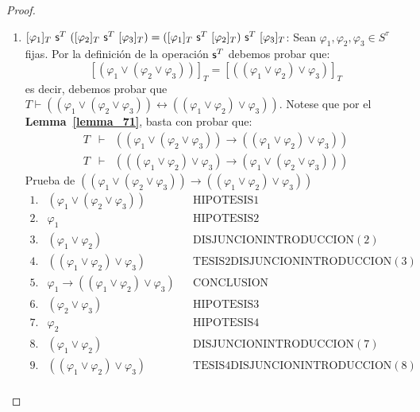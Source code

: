 \begin{proof}
\begin{enumerate}[(1)]
      \item $[\varphi_{1}]_{T} \ \SU^{T} \ ([\varphi_{2}]_{T} \ \SU^{T} \ [\varphi_{3}]_{T}) = ([\varphi_{1}]_{T} \
        \SU^{T} \ [\varphi_{2}]_{T}) \ \SU^{T} \ [\varphi_{3}]_{T}$: Sean $\varphi_{1}, \varphi_{2}, \varphi_{3} \in
        S^{\tau}$ fijas. Por la definición de la operación $\mathsf{s}^{T}$ debemos probar que:
        \[
          [(\varphi_{1} \vee (\varphi_{2} \vee \varphi_{3}))]_{T} = [((\varphi_{1} \vee \varphi_{2}) \vee
          \varphi_{3})]_{T}
        \]
        \PN es decir, debemos probar que $T \vdash ((\varphi_{1} \vee (\varphi_{2} \vee \varphi_{3})) \leftrightarrow
        ((\varphi_{1} \vee \varphi_{2}) \vee \varphi_{3}))$. Notese que por el \textbf{Lemma~\ref{lemma_71}}, basta con
        probar que:
        \[
          \begin{array}{rcl}
            T & \vdash & ((\varphi_{1} \vee (\varphi_{2} \vee \varphi_{3})) \rightarrow ((\varphi_{1} \vee \varphi_{2})
              \vee \varphi_{3})) \\
            T & \vdash & (((\varphi_{1} \vee \varphi_{2}) \vee \varphi_{3}) \rightarrow (\varphi_{1} \vee (\varphi_{2}
              \vee \varphi_{3})))
          \end{array}
        \]
        \PN Prueba de $((\varphi_{1} \vee (\varphi_{2} \vee \varphi_{3})) \rightarrow ((\varphi_{1} \vee \varphi_{2})
        \vee \varphi_{3}))$
        \[
          \begin{array}{llll}
            1. & (\varphi_{1} \vee (\varphi_{2} \vee \varphi_{3})) && \text{HIPOTESIS1} \\
            2. & \varphi_{1} && \text{HIPOTESIS2} \\
            3. & (\varphi_{1} \vee \varphi_{2}) && \text{DISJUNCIONINTRODUCCION}(2) \\
            4. & ((\varphi_{1} \vee \varphi_{2}) \vee \varphi_{3}) && \text{TESIS2DISJUNCIONINTRODUCCION}(3) \\
            5. & \varphi_{1} \rightarrow ((\varphi_{1} \vee \varphi_{2}) \vee \varphi_{3}) && \text{CONCLUSION} \\
            6. & (\varphi_{2} \vee \varphi_{3}) && \text{HIPOTESIS3} \\
            7. & \varphi_{2} && \text{HIPOTESIS4} \\
            8. & (\varphi_{1} \vee \varphi_{2}) && \text{DISJUNCIONINTRODUCCION}(7) \\
            9. & ((\varphi_{1} \vee \varphi_{2}) \vee \varphi_{3}) && \text{TESIS4DISJUNCIONINTRODUCCION}(8) \\

\end{array}\]
\end{enumerate}
\end{proof}
